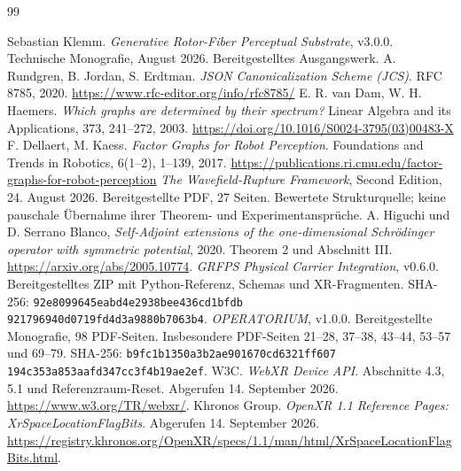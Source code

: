 \documentclass[11pt,a4paper]{article}
\begin{document}
\begin{thebibliography}{99}
 Sebastian Klemm.
\emph{Generative Rotor-Fiber Perceptual Substrate}, v3.0.0.
Technische Monografie, August 2026. Bereitgestelltes Ausgangswerk.
 A. Rundgren, B. Jordan, S. Erdtman.
\emph{JSON Canonicalization Scheme (JCS)}. RFC 8785, 2020.
\url{https://www.rfc-editor.org/info/rfc8785/}
 E. R. van Dam, W. H. Haemers.
\emph{Which graphs are determined by their spectrum?}
Linear Algebra and its Applications, 373, 241--272, 2003.
\url{https://doi.org/10.1016/S0024-3795(03)00483-X}
 F. Dellaert, M. Kaess.
\emph{Factor Graphs for Robot Perception}.
Foundations and Trends in Robotics, 6(1--2), 1--139, 2017.
\url{https://publications.ri.cmu.edu/factor-graphs-for-robot-perception}
 \emph{The Wavefield-Rupture Framework}, Second Edition,
24. August 2026. Bereitgestellte PDF, 27 Seiten. Bewertete Strukturquelle;
keine pauschale Übernahme ihrer Theorem- und Experimentansprüche.
 A. Higuchi und D. Serrano Blanco,
\emph{Self-Adjoint extensions of the one-dimensional Schrödinger operator
with symmetric potential}, 2020. Theorem 2 und Abschnitt III.
\url{https://arxiv.org/abs/2005.10774}.
 \emph{GRFPS Physical Carrier Integration}, v0.6.0.
Bereitgestelltes ZIP mit Python-Referenz, Schemas und XR-Fragmenten.
SHA-256: \texttt{92e8099645eabd4e2938bee436cd1bfdb}\\
\texttt{921796940d0719fd4d3a9880b7063b4}.
 \emph{OPERATORIUM}, v1.0.0.
Bereitgestellte Monografie, 98 PDF-Seiten. Insbesondere PDF-Seiten
21--28, 37--38, 43--44, 53--57 und 69--79.
SHA-256: \texttt{b9fc1b1350a3b2ae901670cd6321ff607}\\
\texttt{194c353a853aafd347cc3f4b19ae2ef}.
 W3C. \emph{WebXR Device API}.
Abschnitte 4.3, 5.1 und Referenzraum-Reset. Abgerufen 14. September 2026.
\url{https://www.w3.org/TR/webxr/}.
 Khronos Group. \emph{OpenXR 1.1 Reference Pages:
XrSpaceLocationFlagBits}. Abgerufen 14. September 2026.
\url{https://registry.khronos.org/OpenXR/specs/1.1/man/html/XrSpaceLocationFlagBits.html}.
\end{thebibliography}
\end{document}
